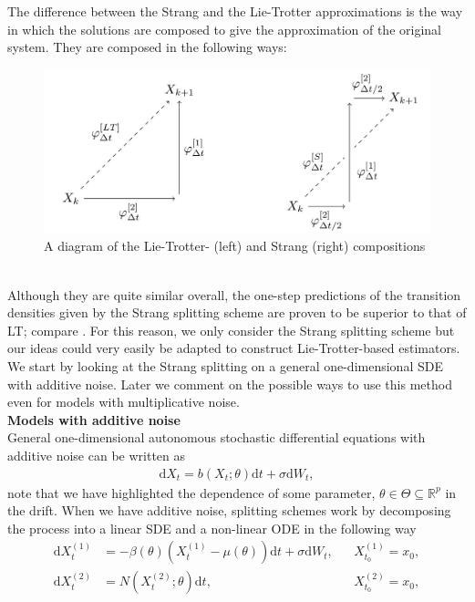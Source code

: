 The difference between the Strang and the Lie-Trotter approximations is the way in which the solutions are composed to give the approximation of the original system. They are composed in the following ways:
\begin{figure}[h!]
    \begin{center}
    \includegraphics[scale = .185]{figures/strangAndLieTrotter.jpeg}
    \end{center}
    \caption{A diagram of the Lie-Trotter- (left) and Strang (right) compositions}
    \label{figure:StrangAndLieTrotterPlot}
\end{figure}\\
Although they are quite similar overall, the one-step predictions of the transition densities given by the Strang splitting scheme are proven to be superior to that of LT; compare \cite[Proposition 3.4 and 3.6]{SplittingSchemes}. For this reason, we only consider the Strang splitting scheme but our ideas could very easily be adapted to construct Lie-Trotter-based estimators. We start by looking at the Strang splitting on a general one-dimensional SDE with additive noise. Later we comment on the possible ways to use this method even for models with multiplicative noise.\\
\textbf{Models with additive noise}\\
General one-dimensional autonomous stochastic differential equations with additive noise can be written as
\begin{align}
    \mathrm{d}X_t = b(X_t; \theta)\mathrm{d}t + \sigma\mathrm{d}W_t, \label{eq:generalAdditiveNoiseSDE}
\end{align}
note that we have highlighted the dependence of some parameter, $\theta\in\Theta\subseteq\mathbb{R}^p$ in the drift. When we have additive noise, splitting schemes work by decomposing the process into a linear SDE and a non-linear ODE in the following way
\begin{align}
    \mathrm{d}X_t^{(1)} &= -\beta(\theta)\left(X_t^{(1)} - \mu(\theta)\right)\mathrm{d}t + \sigma \mathrm{d}W_t, &&X_{t_0}^{(1)} = x_0, \label{SDE_split}\\
    \mathrm{d}X_t^{(2)} &= N\left(X_t^{(2)}; \theta\right)\mathrm{d}t, &&X_{t_0}^{(2)} = x_0, \label{ODE_Split}
\end{align}
